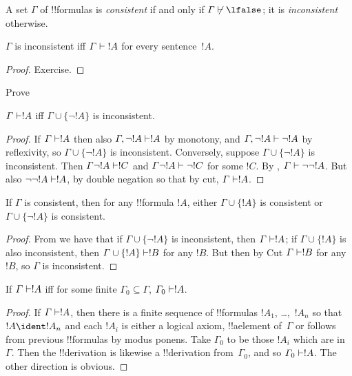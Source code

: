 \documentclass[../../include/open-logic-section]{subfiles}
\begin{document}
\begin{defn}[Consistency]
A set $\Gamma$ of !!{formula}s is \emph{consistent} if and only if
$\Gamma\Proves/ \lfalse$; it is \emph{inconsistent} otherwise.
\end{defn}

\begin{prop}
$\Gamma$ is inconsistent iff $\Gamma \Proves {!A}$ for every
  sentence~$!A$.
\end{prop}

\begin{proof}
Exercise.
\end{proof}

\begin{prob}
Prove 
\end{prob}

\begin{prop} 
$\Gamma \Proves !A$ iff $\Gamma \cup \{\lnot !A\}$ is inconsistent.
\end{prop}

\begin{proof}
If $\Gamma \Proves !A$ then also $\Gamma, \lnot !A \Proves !A$ by
monotony, and $\Gamma, \lnot !A \Proves \lnot !A$ by reflexivity, so
$\Gamma \cup \{\lnot !A\}$ is inconsistent.  Conversely, suppose
$\Gamma \cup \{\lnot !A\}$ is inconsistent. Then $\Gamma \lnot !A
\Proves !C$ and $\Gamma \lnot !A \Proves \lnot !C$ for some $!C$. By
, $\Gamma
\Proves \lnot \lnot !A$. But also $\lnot\lnot!A \Proves !A$, by double
negation so that by cut, $\Gamma \Proves !A$.
\end{proof}

\begin{prop}
If $\Gamma$ is consistent, then for any !!{formula} $!A$, either
$\Gamma \cup\{!A\}$ is consistent or $\Gamma \cup\{\lnot !A\}$ is
consistent.
\end{prop}

\begin{proof}
From  we have that if $\Gamma \cup \{\lnot !A\}$ is
inconsistent, then $\Gamma \Proves !A$; if $\Gamma \cup \{ !A\}$ is
also inconsistent, then $\Gamma \cup \{!A\} \Proves !B$ for any
$!B$. But then by Cut $\Gamma \Proves !B$ for any $!B$, so $\Gamma$ is
inconsistent.
\end{proof}

\begin{prop}
If $\Gamma \Proves !A$ iff for some finite $\Gamma_0 \subseteq
\Gamma$, $\Gamma_0 \Proves !A$.
\end{prop}

\begin{proof}
If $\Gamma \Proves !A$, then there is a finite sequence of
!!{formula}s $!A_1$, \dots,~$!A_n$ so that $!A \ident !A_n$ and each
$!A_i$ is either a logical axiom, !!a{element} of~$\Gamma$ or follows
from previous !!{formula}s by modus ponens.  Take $\Gamma_0$ to be
those $!A_i$ which are in~$\Gamma$.  Then the !!{derivation} is
likewise a !!{derivation} from~$\Gamma_0$, and so $\Gamma_0 \Proves
!A$.  The other direction is obvious.
\end{proof}
\end{document}
